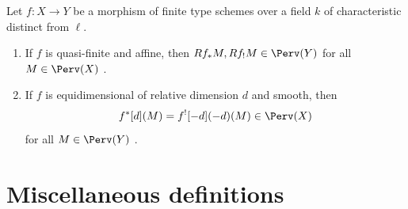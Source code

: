 





\begin{proposition}
    Let $f: X \to Y $ be a morphism of finite type schemes over a field $k$ of characteristic distinct  from $\ell$. 
\begin{enumerate}
    \item If $f$ is quasi-finite and affine, then $R f_* M, Rf_! M \in \Perv(Y)$ for all $M \in \Perv(X)$ {\cite[Corollary III.6.2]{kiehl_weissauer_wcps}}. 
    \item If $f$ is equidimensional of relative dimension $d$ and smooth, then 
    $$f^{*}[d](M) = f^{!}[-d](-d)(M) \in \Perv(X)$$
    for all $M \in \Perv(Y)$ {\cite[Theorem III.7.2]{kiehl_weissauer_wcps}}. 
\end{enumerate}
\end{proposition}

\appendix

\section{Miscellaneous definitions}



